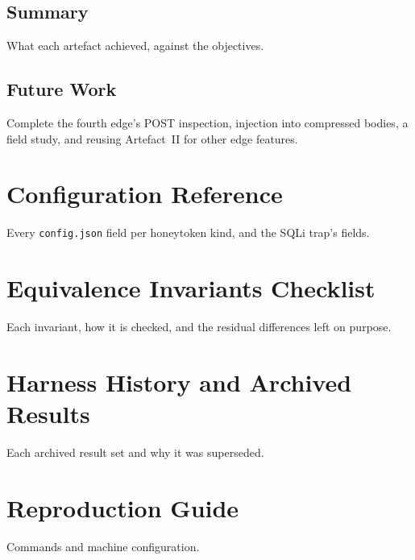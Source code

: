 \documentclass{rptuma}
\begin{document}
\section{Summary}
What each artefact achieved, against the objectives.
\section{Future Work}
Complete the fourth edge's POST inspection, injection into compressed bodies, a field study, and
reusing Artefact~II for other edge features.

\appendix
\chapter{Configuration Reference}
Every \texttt{config.json} field per honeytoken kind, and the SQLi trap's fields.
\chapter{Equivalence Invariants Checklist}
Each invariant, how it is checked, and the residual differences left on purpose.
\chapter{Harness History and Archived Results}
Each archived result set and why it was superseded.
\chapter{Reproduction Guide}
Commands and machine configuration.



\end{document}
